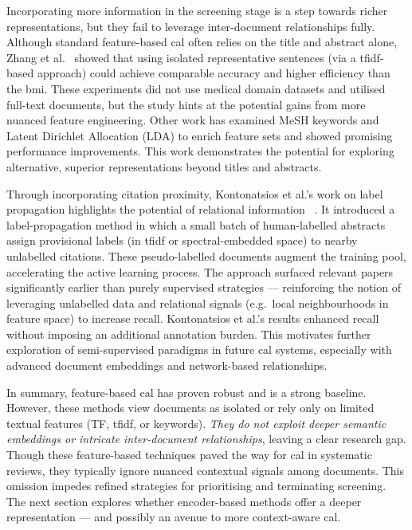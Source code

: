 \documentclass[10pt,oneside]{book}
\begin{document}
Incorporating more information in the screening stage is a step towards richer representations, but they fail to leverage inter-document relationships fully. Although standard feature-based \gls*{cal} often relies on the title and abstract alone, Zhang et al.~\cite{zhang_evaluating_2020} showed that using isolated representative sentences (via a \gls*{tfidf}-based approach) could achieve comparable accuracy and higher efficiency than the \gls*{bmi}. These experiments did not use medical domain datasets and utilised full-text documents, but the study hints at the potential gains from more nuanced feature engineering. Other work has examined MeSH keywords \cite{miwa_reducing_2014} and Latent Dirichlet Allocation (LDA) \cite{hashimoto_topic_2016, miwa_reducing_2014} to enrich feature sets and showed promising performance improvements. This work demonstrates the potential for exploring alternative, superior representations beyond titles and abstracts.

Through incorporating citation proximity, Kontonatsios et al.'s work on label propagation highlights the potential of relational information ~\cite{kontonatsios_semi-supervised_2017}. It introduced a label-propagation method in which a small batch of human-labelled abstracts assign provisional labels (in \gls*{tfidf} or spectral-embedded space) to nearby unlabelled citations. These pseudo-labelled documents augment the training pool, accelerating the active learning process. The approach surfaced relevant papers significantly earlier than purely supervised strategies — reinforcing the notion of leveraging unlabelled data and relational signals (e.g.\ local neighbourhoods in feature space) to increase recall. Kontonatsios et al.’s results enhanced recall without imposing an additional annotation burden. This motivates further exploration of semi-supervised paradigms in future \gls*{cal} systems, especially with advanced document embeddings and network-based relationships.

In summary, feature-based \gls*{cal} has proven robust and is a strong baseline.  However, these methods view documents as isolated or rely only on limited textual features (TF, \gls*{tfidf}, or keywords). \emph{They do not exploit deeper semantic embeddings or intricate inter-document relationships}, leaving a clear research gap. Though these feature-based techniques paved the way for \gls*{cal} in systematic reviews, they typically ignore nuanced contextual signals among documents. This omission impedes refined strategies for prioritising and terminating screening. The next section explores whether encoder-based methods offer a deeper representation — and possibly an avenue to more context-aware \gls*{cal}.
\end{document}

